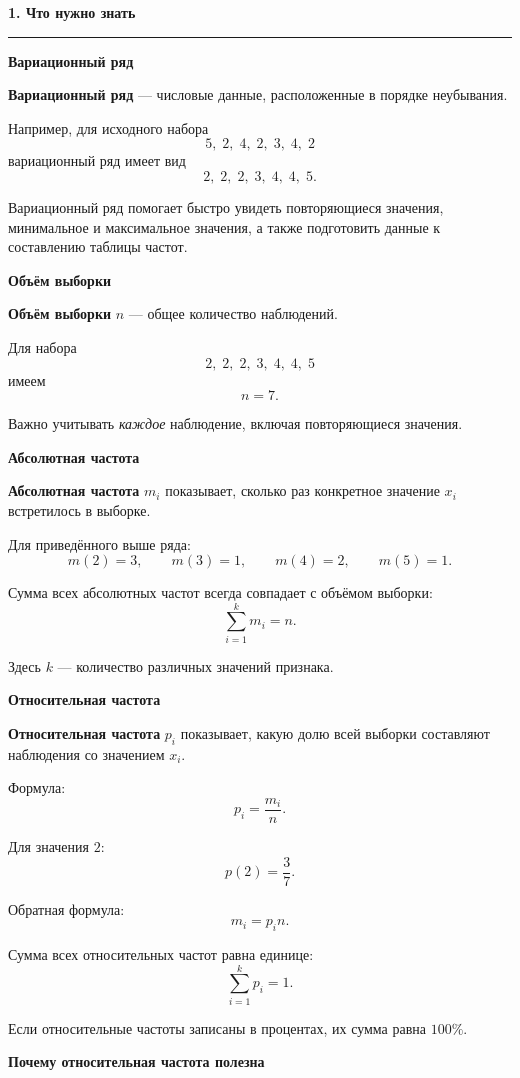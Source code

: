 \documentclass[a4paper,12pt]{article}
\newcommand{\sectiontitle}[1]{%
    \vspace{0.4em}
    {\Large\bfseries\color{darkaccent}#1\par}
    \vspace{0.25em}
    {\color{linegray}\rule{\linewidth}{0.6pt}}
    \vspace{0.7em}
}
\newcommand{\subsectiontitle}[1]{%
    \vspace{0.5em}
    {\large\bfseries\color{accent}#1\par}
    \vspace{0.25em}
}
\newcommand{\important}[1]{%
    {\color{darkaccent}\bfseries #1}
}
\begin{document}

\sectiontitle{1. Что нужно знать}

\subsectiontitle{Вариационный ряд}

\important{Вариационный ряд} --- числовые данные, расположенные в порядке
неубывания.

Например, для исходного набора
\[
5,\;2,\;4,\;2,\;3,\;4,\;2
\]
вариационный ряд имеет вид
\[
2,\;2,\;2,\;3,\;4,\;4,\;5.
\]

Вариационный ряд помогает быстро увидеть повторяющиеся значения, минимальное
и максимальное значения, а также подготовить данные к составлению таблицы
частот.

\subsectiontitle{Объём выборки}

\important{Объём выборки} \(n\) --- общее количество наблюдений.

Для набора
\[
2,\;2,\;2,\;3,\;4,\;4,\;5
\]
имеем
\[
n=7.
\]

Важно учитывать \emph{каждое} наблюдение, включая повторяющиеся значения.

\subsectiontitle{Абсолютная частота}

\important{Абсолютная частота} \(m_i\) показывает, сколько раз конкретное
значение \(x_i\) встретилось в выборке.

Для приведённого выше ряда:
\[
m(2)=3,\qquad
m(3)=1,\qquad
m(4)=2,\qquad
m(5)=1.
\]

Сумма всех абсолютных частот всегда совпадает с объёмом выборки:
\[
\boxed{\sum_{i=1}^{k}m_i=n}.
\]

Здесь \(k\) --- количество различных значений признака.

\subsectiontitle{Относительная частота}

\important{Относительная частота} \(p_i\) показывает, какую долю всей выборки
составляют наблюдения со значением \(x_i\).

Формула:
\[
\boxed{p_i=\frac{m_i}{n}}.
\]

Для значения \(2\):
\[
p(2)=\frac{3}{7}.
\]

Обратная формула:
\[
\boxed{m_i=p_i n}.
\]

Сумма всех относительных частот равна единице:
\[
\boxed{\sum_{i=1}^{k}p_i=1}.
\]

Если относительные частоты записаны в процентах, их сумма равна \(100\%\).

\subsectiontitle{Почему относительная частота полезна}
\end{document}
